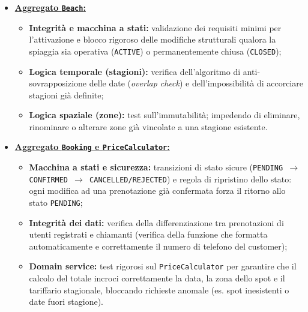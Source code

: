 \documentclass[a4paper,11pt]{article}
\begin{document}
\begin{itemize}[leftmargin=*]
	\item \underline{\textbf{Aggregato \texttt{Beach}:}}
	\label{itm:domain_beach}
	\begin{itemize}[nosep]
		\item \textbf{Integrità e macchina a stati:} validazione dei requisiti minimi per l'attivazione e blocco rigoroso delle modifiche strutturali qualora la spiaggia sia operativa (\texttt{ACTIVE}) o permanentemente chiusa (\texttt{CLOSED});
		
		\item \textbf{Logica temporale (stagioni):} verifica dell'algoritmo di anti-sovrapposizione delle date (\textit{overlap check}) e dell'impossibilità di accorciare stagioni già definite;
		
		\item \textbf{Logica spaziale (zone):} test sull'immutabilità; impedendo di eliminare, rinominare o alterare zone già vincolate a una stagione esistente.
	\end{itemize}
	
	\item \underline{\textbf{Aggregato \texttt{Booking} e \texttt{PriceCalculator}:}}
	\label{itm:domain_booking_pricecalculator}
	\begin{itemize}[nosep]
		\item \textbf{Macchina a stati e sicurezza:} transizioni di stato sicure (\texttt{PENDING $\rightarrow$ CONFIRMED $\rightarrow$ CANCELLED/REJECTED}) e regola di ripristino dello stato: ogni modifica ad una prenotazione già confermata forza il ritorno allo stato \texttt{PENDING};
		
		\item \textbf{Integrità dei dati:} verifica della differenziazione tra prenotazioni di utenti registrati e chiamanti (verifica della funzione che formatta automaticamente e correttamente il numero di telefono del customer);
		
		\item \textbf{Domain service:} test rigorosi sul \texttt{PriceCalculator} per garantire che il calcolo del totale incroci correttamente la data, la zona dello spot e il tariffario stagionale, bloccando richieste anomale (es. spot inesistenti o date fuori stagione).
	\end{itemize}
	
	\newpage
	

\end{itemize}
\end{document}
